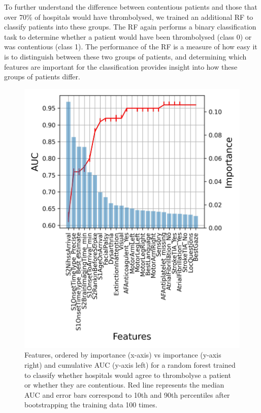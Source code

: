 \documentclass[12pt,a4paper, pdftex]{elsarticle}
\begin{document}
To further understand the difference between contentious patients and those that over 70\% of hospitals would have thrombolysed, we trained an additional RF to classify patients into these groups. The RF again performs a binary classification task to determine whether a patient would have been thrombolysed (class 0) or was contentious (class 1). The performance of the RF is a measure of how easy it is to distinguish between these two groups of patients, and determining which features are important for the classification provides insight into how these groups of patients differ. 

\begin{figure}[ht!!!]
\centering
\includegraphics[width=15cm]{figures/auc_features.jpg}
\caption{Features, ordered by importance (x-axis) vs importance (y-axis right) and cumulative AUC (y-axis left) for a random forest trained to classify whether hospitals would agree to thrombolyse a patient or whether they are contentious. Red line represents the median AUC and error bars correspond to 10th and 90th percentiles after bootstrapping the training data 100 times.}
\label{fig:auc_features}
\end{figure}
\end{document}

